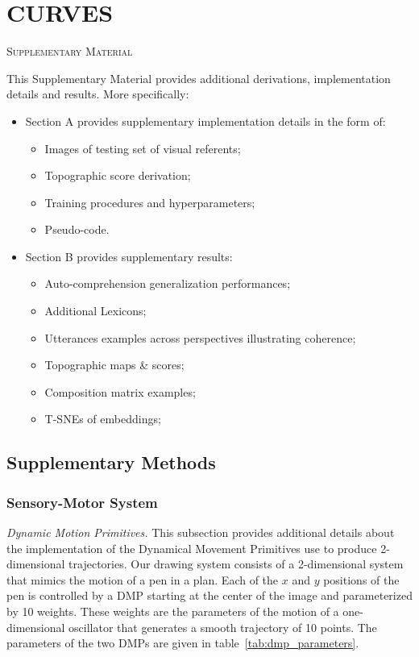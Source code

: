 
\chapter{CURVES}

\begin{center}
    \Large \textsc{Supplementary Material}
\end{center}
This Supplementary Material provides additional derivations, implementation details and results. More specifically: 
\begin{itemize}[noitemsep]
\item Section A provides supplementary implementation details in the form of:
    \begin{itemize}[noitemsep]
    \item Images of testing set of visual referents;
    \item Topographic score derivation;
    \item Training procedures and hyperparameters;
    \item Pseudo-code.
\end{itemize}

\item Section B provides supplementary results:
    \begin{itemize}[noitemsep]
    \item Auto-comprehension generalization performances;
    \item Additional Lexicons;
    \item Utterances examples across perspectives illustrating coherence;
    \item Topographic maps \& scores;
    \item Composition matrix examples;
    \item T-SNEs of embeddings;
\end{itemize}
\end{itemize}

\section{Supplementary Methods}

\subsection{Sensory-Motor System}
\label{sec:suppl_sensorymotor}
\textit{Dynamic Motion Primitives.} This subsection provides additional details about the implementation of the Dynamical Movement Primitives use to produce 2-dimensional trajectories. Our drawing system consists of a 2-dimensional system that mimics the motion of a pen in a plan. Each of the $x$ and $y$ positions of the pen is controlled by a DMP starting at the center of the image and parameterized by 10 weights. These weights are the parameters of the motion of a one-dimensional oscillator that generates a smooth trajectory of 10 points. The parameters of the two DMPs are given in table~\ref{tab:dmp_parameters}.

